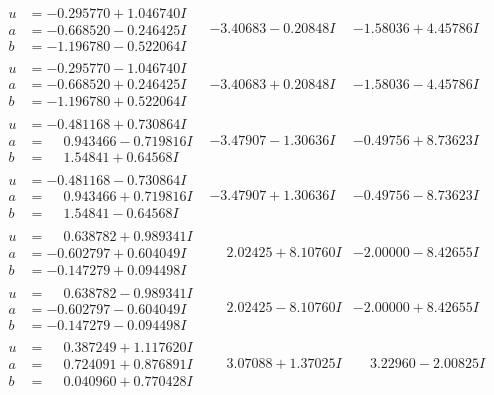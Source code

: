 \documentclass[1p]{elsarticle_modified}
\theoremstyle{definition}
\begin{document}
$$\begin{array}{c|c|c}
\begin{aligned}
u &= -0.295770 + 1.046740 I \\
a &= -0.668520 - 0.246425 I \\
b &= -1.196780 - 0.522064 I\end{aligned}
 & -3.40683 - 0.20848 I & -1.58036 + 4.45786 I \\ \hline\begin{aligned}
u &= -0.295770 - 1.046740 I \\
a &= -0.668520 + 0.246425 I \\
b &= -1.196780 + 0.522064 I\end{aligned}
 & -3.40683 + 0.20848 I & -1.58036 - 4.45786 I \\ \hline\begin{aligned}
u &= -0.481168 + 0.730864 I \\
a &= \phantom{-}0.943466 - 0.719816 I \\
b &= \phantom{-}1.54841 + 0.64568 I\end{aligned}
 & -3.47907 - 1.30636 I & -0.49756 + 8.73623 I \\ \hline\begin{aligned}
u &= -0.481168 - 0.730864 I \\
a &= \phantom{-}0.943466 + 0.719816 I \\
b &= \phantom{-}1.54841 - 0.64568 I\end{aligned}
 & -3.47907 + 1.30636 I & -0.49756 - 8.73623 I \\ \hline\begin{aligned}
u &= \phantom{-}0.638782 + 0.989341 I \\
a &= -0.602797 + 0.604049 I \\
b &= -0.147279 + 0.094498 I\end{aligned}
 & \phantom{-}2.02425 + 8.10760 I & -2.00000 - 8.42655 I \\ \hline\begin{aligned}
u &= \phantom{-}0.638782 - 0.989341 I \\
a &= -0.602797 - 0.604049 I \\
b &= -0.147279 - 0.094498 I\end{aligned}
 & \phantom{-}2.02425 - 8.10760 I & -2.00000 + 8.42655 I \\ \hline\begin{aligned}
u &= \phantom{-}0.387249 + 1.117620 I \\
a &= \phantom{-}0.724091 + 0.876891 I \\
b &= \phantom{-}0.040960 + 0.770428 I\end{aligned}
 & \phantom{-}3.07088 + 1.37025 I & \phantom{-}3.22960 - 2.00825 I \\ \hline\begin{aligned}

\end{aligned}
\end{array}$$
\end{document}
